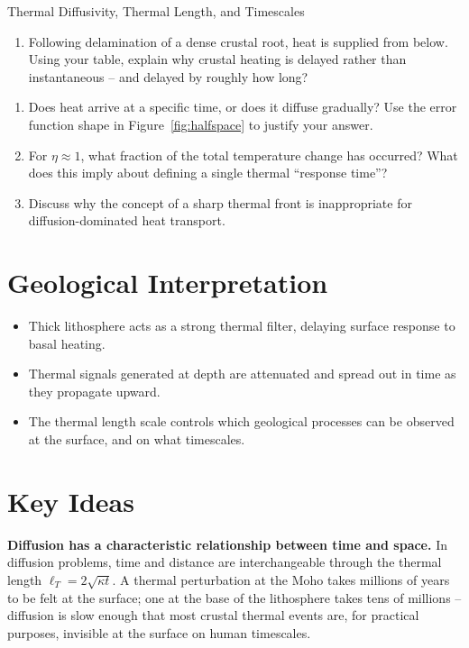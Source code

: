 \begin{activity}{Thermal Diffusivity, Thermal Length, and Timescales}
\begin{questions}
\begin{enumerate}[label=(\alph*)]
  \item Following delamination of a dense crustal root, heat is supplied from below. Using your table, explain why crustal heating is delayed rather than instantaneous -- and delayed by roughly how long?
  \answerbox[2.5cm]
\end{enumerate}


\begin{enumerate}[label=(\alph*)]
  \item Does heat arrive at a specific time, or does it diffuse gradually? Use the error function shape in Figure~\ref{fig:halfspace} to justify your answer.
  \answerbox[2cm]

  \item For $\eta \approx 1$, what fraction of the total temperature change has occurred? What does this imply about defining a single thermal ``response time''?
  \answerbox[2cm]

  \item Discuss why the concept of a sharp thermal front is inappropriate for diffusion-dominated heat transport.
  \answerbox[2cm]
\end{enumerate}

\end{questions}

\section*{Geological Interpretation}

\begin{itemize}
  \item Thick lithosphere acts as a strong thermal filter, delaying surface response to basal heating.
  \item Thermal signals generated at depth are attenuated and spread out in time as they propagate upward.
  \item The thermal length scale controls which geological processes can be observed at the surface, and on what timescales.
\end{itemize}

\section*{Key Ideas}

\textbf{Diffusion has a characteristic relationship between time and space.} In diffusion problems, time and distance are interchangeable through the thermal length $\ell_T = 2\sqrt{\kappa t}$. A thermal perturbation at the Moho takes millions of years to be felt at the surface; one at the base of the lithosphere takes tens of millions -- diffusion is slow enough that most crustal thermal events are, for practical purposes, invisible at the surface on human timescales.


\end{activity}

